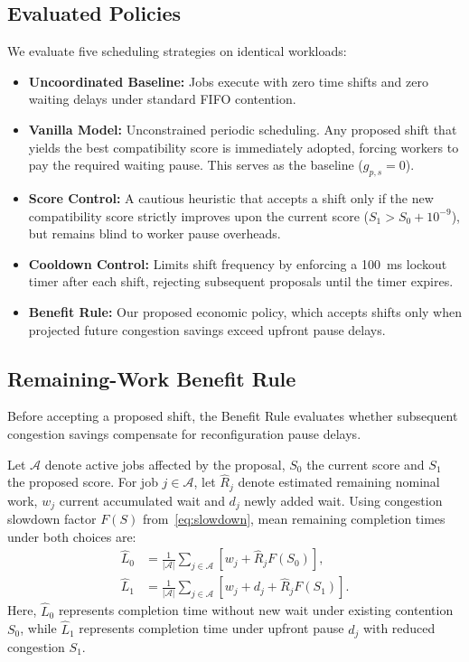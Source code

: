 \documentclass[conference]{IEEEtran}
\begin{document}
\subsection{Evaluated Policies}

We evaluate five scheduling strategies on identical workloads:
\begin{itemize}
    \item \textbf{Uncoordinated Baseline:} Jobs execute with zero time shifts and zero waiting delays under standard FIFO contention.
    \item \textbf{Vanilla Model:} Unconstrained periodic scheduling. Any proposed shift that yields the best compatibility score is immediately adopted, forcing workers to pay the required waiting pause. This serves as the baseline ($g_{p,s} = 0$).
    \item \textbf{Score Control:} A cautious heuristic that accepts a shift only if the new compatibility score strictly improves upon the current score ($S_1 > S_0 + 10^{-9}$), but remains blind to worker pause overheads.
    \item \textbf{Cooldown Control:} Limits shift frequency by enforcing a 100~ms lockout timer after each shift, rejecting subsequent proposals until the timer expires.
    \item \textbf{Benefit Rule:} Our proposed economic policy, which accepts shifts only when projected future congestion savings exceed upfront pause delays.
\end{itemize}

\subsection{Remaining-Work Benefit Rule}

Before accepting a proposed shift, the Benefit Rule evaluates whether subsequent congestion savings compensate for reconfiguration pause delays.

Let $\mathcal{A}$ denote active jobs affected by the proposal, $S_0$ the current score and $S_1$ the proposed score. For job $j \in \mathcal{A}$, let $\widehat{R}_j$ denote estimated remaining nominal work, $w_j$ current accumulated wait and $d_j$ newly added wait. Using congestion slowdown factor $F(S)$ from~\eqref{eq:slowdown}, mean remaining completion times under both choices are:
\begin{align}
 \widehat{L}_0 &= \frac{1}{|\mathcal{A}|}
 \sum_{j\in\mathcal{A}}[w_j+\widehat{R}_jF(S_0)],
 \label{eq:keep-estimate}\\
 \widehat{L}_1 &= \frac{1}{|\mathcal{A}|}
 \sum_{j\in\mathcal{A}}[w_j+d_j+\widehat{R}_jF(S_1)].
 \label{eq:change-estimate}
\end{align}
Here, $\widehat{L}_0$ represents completion time without new wait under existing contention $S_0$, while $\widehat{L}_1$ represents completion time under upfront pause $d_j$ with reduced congestion $S_1$.
\end{document}
